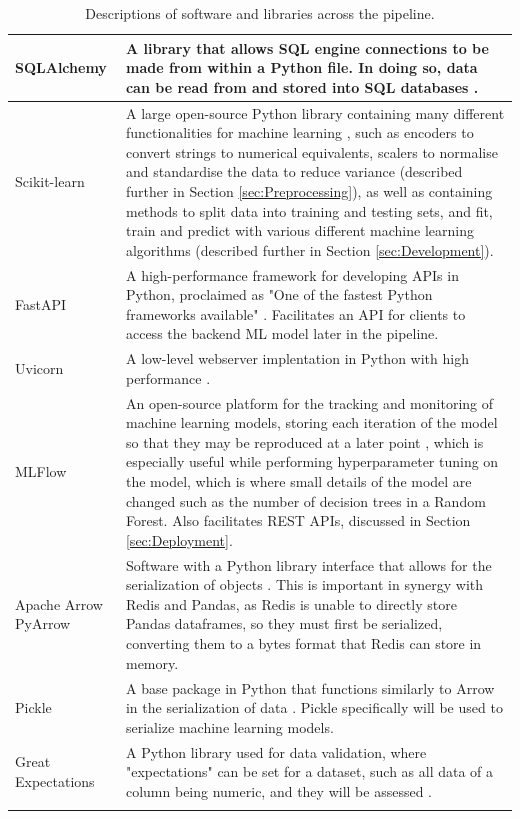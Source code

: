 \documentclass[12pt]{report}
\begin{document}
\begin{longtable}{ |p{}| p{}|}
    \hline
    SQLAlchemy &
    A library that allows SQL engine connections to be made from within a Python file. In 
    doing so, data can be read from and stored into SQL databases \autocite{sqlalchemy_sqlalchemy_nodate}.\\
    \hline
    Scikit-learn & 
    A large open-source Python library containing many different functionalities for machine learning \autocite{scikit-learn_scikit-learn_nodate}, 
    such as encoders to convert strings to numerical equivalents, scalers to normalise and standardise 
    the data to reduce variance (described further in Section \ref{sec:Preprocessing}), as well as containing 
    methods to split data into training and testing sets, and fit, train and predict with various different 
    machine learning algorithms (described further in Section \ref{sec:Development}).\\
    \hline
    FastAPI &
    A high-performance framework for developing APIs in Python, proclaimed
    as "One of the fastest Python frameworks available" \autocite{fastapi_fastapi_nodate}.
    Facilitates an API for clients to access the backend ML model later in the pipeline. \\
    \hline
    Uvicorn &
    A low-level webserver implentation in Python with high performance \autocite{uvicorn_uvicorn_nodate}.\\
    \hline
    MLFlow &
    An open-source platform for the tracking and monitoring of machine learning models, 
    storing each iteration of the model so that they may be reproduced at a later point \autocite{mlflow_mlflow_nodate},
    which is especially useful while performing hyperparameter tuning on the model, which is where 
    small details of the model are changed such as the number of decision trees in a Random Forest.
    Also facilitates REST APIs, discussed in Section \ref{sec:Deployment}.\\
    \hline
    Apache Arrow \newline PyArrow &
    Software with a Python library interface that allows for the serialization of objects \autocite{apache_streaming_nodate}. 
    This is important in synergy with Redis and Pandas, as Redis is unable to directly store Pandas dataframes, 
    so they must first be serialized, converting them to a bytes format that Redis can store in memory.\\
    \hline
    Pickle &
    A base package in Python that functions similarly to Arrow in the serialization of data \autocite{python_pickle_nodate}.
    Pickle specifically will be used to serialize machine learning models.\\
    \hline
    Great Expectations &
    A Python library used for data validation, where "expectations" can be set for a dataset, such as 
    all data of a column being numeric, and they will be assessed \autocite{gx_gx_nodate}.\\
    \hline
\caption{Descriptions of software and libraries across the pipeline.}\label{tab:softwareDescriptions}
\end{longtable}
\end{document}
